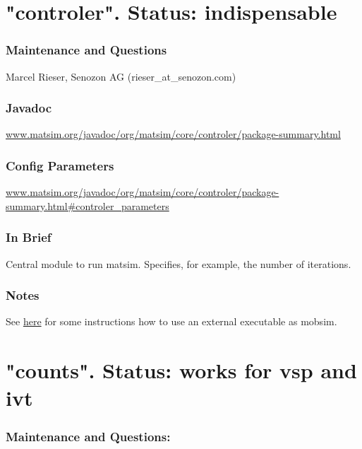 \vfill\eject
\section{"controler". Status: indispensable}

\subsubsection{\textbf{Maintenance and Questions}}

Marcel Rieser, Senozon AG (rieser\_at\_senozon.com)

\subsubsection{\textbf{Javadoc}}

\href{http://www.matsim.org/javadoc/org/matsim/core/controler/package-summary.html}{www.matsim.org/javadoc/org/matsim/core/controler/package-summary.html}



\subsubsection{Config Parameters}

\href{http://www.matsim.org/javadoc/org/matsim/core/controler/package-summary.html#controler_parameters}{www.matsim.org/javadoc/org/matsim/core/controler/package-summary.html\#controler\_parameters}


\subsubsection{\textbf{\textbf{In Brief}}}

Central module to run matsim. Specifies, for example, the number of iterations.



\subsubsection{Notes}

See \href{http://matsim.org/node/398}{here} for some instructions how to use an external executable as mobsim.

\vfill\eject
\section{"counts". Status: works for vsp and ivt}

\subsubsection{\textbf{Maintenance and Questions:}}

